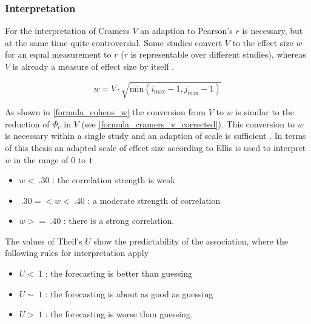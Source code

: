 
\subsubsection{Interpretation}
For the interpretation of Cramers $V$ an adaption to Pearson's $r$ is necessary, but at the same time quite controversial. Some studies convert $V$ to the effect size $w$ for an equal measurement to $r$ ($r$ is representable over different studies), whereas $V$ is already a measure of effect size by itself \parencite{Baguley2016}.

\smallskip
\begin{equation}
\label{formula_cohens_w}
	w = V \cdot \sqrt{\text{min}(i_{\text{max}}-1,j_{\text{max}}-1)}
\end{equation}

\medskip

As shown in \cref{formula_cohens_w} \parencite{Baguley2016} the conversion from $V$ to $w$ is similar to the reduction of $\Phi_c$ in $V$ (see \cref{formula_cramers_v_corrected}). This conversion to $w$ is necessary within a single study and an adaption of scale is sufficient \parencite{Baguley2016}. In terms of this thesis an adapted scale of effect size according to Ellis is used to interpret $w$ in the range of $0$ to $1$ \parencite{Cohen1988,Ellis2010,Hemmerich2019}

\begin{itemize}
	\item $w < \: .30$ : the correlation strength is weak
	\item $\: .30 =< w < \: .40$ : a moderate strength of correlation
	\item $w >= \: .40$ : there is a strong correlation.
\end{itemize}

The values of Theil's $U$ show the predictability of the association, where the following rules for interpretation apply \parencite{TheilsInt01,TheilsInt02,TheilsInt03}

\begin{itemize}
	\item $U < \: 1$ : the forecasting is better than guessing
	\item $U \sim \: 1$ : the forecasting is about as good as guessing
	\item $U > \: 1$ : the forecasting is worse than guessing.
\end{itemize}

